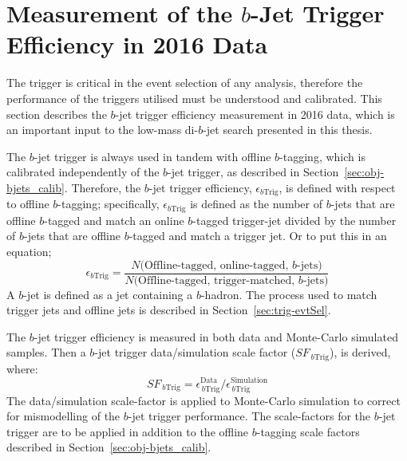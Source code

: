 \section{ Measurement of the $b$-Jet Trigger Efficiency in 2016 Data}
\label{sec:trig-bjet_eff}

The trigger is critical in the event selection of any analysis,
therefore the performance of the triggers utilised must be understood and calibrated.
This section describes the \mbox{$b$-jet} trigger efficiency measurement in 2016 data,
which is an important input to the low-mass di-$b$-jet search presented in this thesis.


The $b$-jet trigger is always used in tandem with offline $b$-tagging, which is calibrated independently of the $b$-jet trigger, as described in Section~\ref{sec:obj-bjets_calib}.
Therefore, the $b$-jet trigger efficiency, $\epsilon_{b\text{Trig}}$, is defined with respect to offline $b$-tagging;
specifically, $\epsilon_{b\text{Trig}}$ is defined as the number of $b$-jets that are offline $b$-tagged and match an online $b$-tagged trigger-jet
divided by the number of $b$-jets that are offline $b$-tagged and match a trigger jet.
Or to put this in an equation;
\begin{equation}
  \epsilon_{b\text{Trig}} = \frac{N(\text{Offline-tagged, online-tagged, $b$-jets)}}{N(\text{Offline-tagged, trigger-matched, $b$-jets)}}
  \label{eq:trig-eff}
\end{equation}
A $b$-jet is defined as a jet containing a $b$-hadron.
The process used to match trigger jets and offline jets is described in Section~\ref{sec:trig-evtSel}.

The $b$-jet trigger efficiency is measured in both data and Monte-Carlo simulated samples.
Then a $b$-jet trigger data/simulation scale factor ($SF_{\,b\text{Trig}}$), is derived, where:
\begin{equation}
 SF_{\,b\text{Trig}} = \epsilon_{\,b\text{Trig}}^{\text{Data}}/\epsilon_{\,b\text{Trig}}^{\text{Simulation}}
\end{equation}
The data/simulation scale-factor is applied to Monte-Carlo simulation to correct for mismodelling of the $b$-jet trigger performance.
The scale-factors for the $b$-jet trigger are to be applied in addition to the offline $b$-tagging scale factors described in Section~\ref{sec:obj-bjets_calib}.


